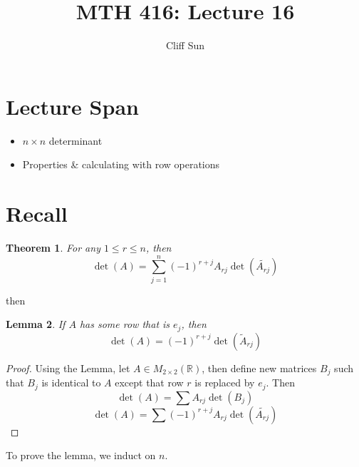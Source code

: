 \documentclass{article}
\title{MTH 416: Lecture 16}
\author{Cliff Sun}
\newtheorem{theorem}{Theorem}[section]
\newtheorem{lemma}[theorem]{Lemma}
\newtheorem{one minute paper}[theorem]{One Minute Paper}
\begin{document}
\maketitle

\section*{Lecture Span}
\begin{itemize}
    \item $n \times n$ determinant
    \item Properties \& calculating with row operations
\end{itemize}

\section*{Recall}

\begin{theorem}
    For any $1 \leq r \leq n$, then 
    \begin{equation}
        \det(A) = \sum_{j=1}^{n}(-1)^{r+j}A_{rj}\det(\tilde{A_{rj}})
    \end{equation}
\end{theorem}

then 

\begin{lemma}
    If $A$ has some row that is $e_j$, then 
    \begin{equation}
        \det(A) = (-1)^{r + j}\det(\tilde{A}_{rj})
    \end{equation}
\end{lemma}

\begin{proof}
    Using the Lemma, let $A \in M_{2 \times 2}(\mathbb{R})$, then define new matrices $B_j$ such that 
    $B_j$ is identical to $A$ except that row $r$ is replaced by $e_j$. Then 
    \begin{equation}
        \det(A) = \sum A_{rj}\det(B_j)
    \end{equation}
    \begin{equation}
        \det(A) = \sum (-1)^{r + j}A_{rj}\det(\tilde{A_{rj}})
    \end{equation}
\end{proof}

To prove the lemma, we induct on $n$. 
\end{document}
